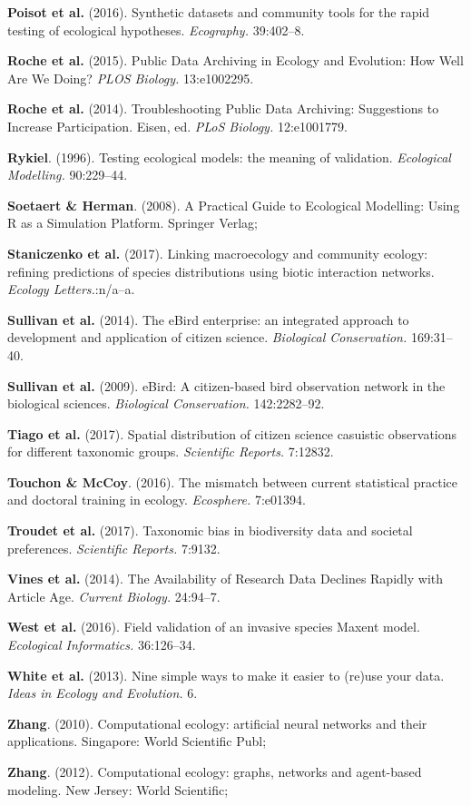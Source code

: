 \documentclass[11pt,serif]{article}
\begin{document}
\hypertarget{ref-PoiGra16}{}
\textbf{Poisot et al.} (2016). Synthetic datasets and community tools
for the rapid testing of ecological hypotheses. \emph{Ecography.}
39:402--8.

\hypertarget{ref-RocKru15}{}
\textbf{Roche et al.} (2015). Public Data Archiving in Ecology and
Evolution: How Well Are We Doing? \emph{PLOS Biology.} 13:e1002295.

\hypertarget{ref-RocLan14}{}
\textbf{Roche et al.} (2014). Troubleshooting Public Data Archiving:
Suggestions to Increase Participation. Eisen, ed. \emph{PLoS Biology.}
12:e1001779.

\hypertarget{ref-Ryk96}{}
\textbf{Rykiel}. (1996). Testing ecological models: the meaning of
validation. \emph{Ecological Modelling.} 90:229--44.

\hypertarget{ref-SoeHer08}{}
\textbf{Soetaert \& Herman}. (2008). A Practical Guide to Ecological
Modelling: Using R as a Simulation Platform. Springer Verlag;

\hypertarget{ref-StaSiv17}{}
\textbf{Staniczenko et al.} (2017). Linking macroecology and community
ecology: refining predictions of species distributions using biotic
interaction networks. \emph{Ecology Letters.}:n/a--a.

\hypertarget{ref-SulAyc14}{}
\textbf{Sullivan et al.} (2014). The eBird enterprise: an integrated
approach to development and application of citizen science.
\emph{Biological Conservation.} 169:31--40.

\hypertarget{ref-SulWoo09}{}
\textbf{Sullivan et al.} (2009). eBird: A citizen-based bird observation
network in the biological sciences. \emph{Biological Conservation.}
142:2282--92.

\hypertarget{ref-TiaCei17}{}
\textbf{Tiago et al.} (2017). Spatial distribution of citizen science
casuistic observations for different taxonomic groups. \emph{Scientific
Reports.} 7:12832.

\hypertarget{ref-TouMcC16}{}
\textbf{Touchon \& McCoy}. (2016). The mismatch between current
statistical practice and doctoral training in ecology. \emph{Ecosphere.}
7:e01394.

\hypertarget{ref-TroGra17}{}
\textbf{Troudet et al.} (2017). Taxonomic bias in biodiversity data and
societal preferences. \emph{Scientific Reports.} 7:9132.

\hypertarget{ref-VinAlb14}{}
\textbf{Vines et al.} (2014). The Availability of Research Data Declines
Rapidly with Article Age. \emph{Current Biology.} 24:94--7.

\hypertarget{ref-WesKum16}{}
\textbf{West et al.} (2016). Field validation of an invasive species
Maxent model. \emph{Ecological Informatics.} 36:126--34.

\hypertarget{ref-WhiBal13}{}
\textbf{White et al.} (2013). Nine simple ways to make it easier to
(re)use your data. \emph{Ideas in Ecology and Evolution.} 6.

\hypertarget{ref-Zha10}{}
\textbf{Zhang}. (2010). Computational ecology: artificial neural
networks and their applications. Singapore: World Scientific Publ;

\hypertarget{ref-Zha12}{}
\textbf{Zhang}. (2012). Computational ecology: graphs, networks and
agent-based modeling. New Jersey: World Scientific;
\end{document}
